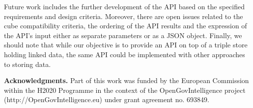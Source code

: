\documentclass{llncs}
\begin{document}
Future work includes the further development of the API based on the specified requirements and design criteria. Moreover, there are open issues related to the cube compatibility criteria, the ordering of the API results and the expression of the API's input either as separate parameters or as a JSON object. Finally, we should note that while our objective is to provide an API on top of a triple store holding linked data, the same API could be implemented with other approaches to storing data.

\vskip 0.2cm
\noindent \textbf{Acknowledgments.} Part of this work was funded by the European Commission
within the H2020 Programme in the context of the OpenGovIntelligence
project (http://OpenGovIntelligence.eu) under grant agreement no. 693849.




\end{document}
